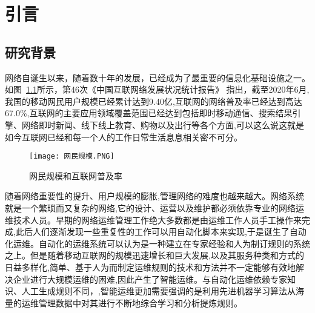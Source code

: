 
\chapter{引言}


\section{研究背景}

网络自诞生以来，随着数十年的发展，已经成为了最重要的信息化基础设施之一。如图~\ref{fig:example}所示，第46次《中国互联网络发展状况统计报告》\cite{cac.gov} 指出，截至2020年6月,我国的移动网民用户规模已经累计达到9.40亿,互联网的网络普及率已经达到高达67.0\%,互联网的主要应用领域覆盖范围已经达到包括即时移动通信、搜索结果引擎、网络即时新闻、线下线上教育、购物以及出行等各个方面,可以这么说这就是如今互联网已经和每一个人的工作日常生活息息相关密不可分。



\begin{figure}
    \centering
    \texttt{[image: 网民规模.PNG]}
    \caption{网民规模和互联网普及率}
    \label{fig:example}
  \end{figure}

随着网络重要性的提升、用户规模的膨胀,管理网络的难度也越来越大。网络系统就是一个繁琐而又复杂的网络,它的设计、运营以及维护都必须依靠专业的网络运维技术人员。早期的网络运维管理工作绝大多数都是由运维工作人员手工操作来完成,此后人们逐渐发现一些重复性的工作可以用自动化脚本来实现,于是诞生了自动化运维。自动化的运维系统可以认为是一种建立在专家经验和人为制订规则的系统之上。但是随着移动互联网的规模迅速增长和巨大发展,以及其服务种类和方式的日益多样化,简单、基于人为而制定运维规则的技术和方法并不一定能够有效地解决企业进行大规模运维的困难,因此产生了智能运维。与自动化运维依赖专家知识、人工生成规则不同，,智能运维更加需要强调的是利用先进机器学习算法从海量的运维管理数据中对其进行不断地综合学习和分析提炼规则。


